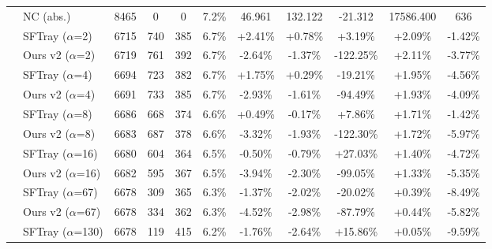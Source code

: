 \begin{table}[t]
{\begin{tabular}{ll|cccc|ccc|cc}
\addlinespace[0.3em]

\midrule

\multirow{25}{*}{cva6} & NC (abs.) & 8465 & 0 & 0 & 7.2\% & 46.961 & 132.122 & -21.312 & 17586.400 & 636 \\

\addlinespace[0.4em]

 & SFTray ($\alpha$=2) & 6715 & 740 & 385 & 6.7\% & +2.41\% & +0.78\% & +3.19\% & +2.09\% & -1.42\% \\

 & Ours v2 ($\alpha$=2) & 6719 & 761 & 392 & 6.7\% & -2.64\% & -1.37\% & -122.25\% & +2.11\% & -3.77\% \\

\addlinespace[0.3em]

 & SFTray ($\alpha$=4) & 6694 & 723 & 382 & 6.7\% & +1.75\% & +0.29\% & -19.21\% & +1.95\% & -4.56\% \\

 & Ours v2 ($\alpha$=4) & 6691 & 733 & 385 & 6.7\% & -2.93\% & -1.61\% & -94.49\% & +1.93\% & -4.09\% \\

\addlinespace[0.3em]

 & SFTray ($\alpha$=8) & 6686 & 668 & 374 & 6.6\% & +0.49\% & -0.17\% & +7.86\% & +1.71\% & -1.42\% \\

 & Ours v2 ($\alpha$=8) & 6683 & 687 & 378 & 6.6\% & -3.32\% & -1.93\% & -122.30\% & +1.72\% & -5.97\% \\

\addlinespace[0.3em]

 & SFTray ($\alpha$=16) & 6680 & 604 & 364 & 6.5\% & -0.50\% & -0.79\% & +27.03\% & +1.40\% & -4.72\% \\

 & Ours v2 ($\alpha$=16) & 6682 & 595 & 367 & 6.5\% & -3.94\% & -2.30\% & -99.05\% & +1.33\% & -5.35\% \\

\addlinespace[0.3em]

 & SFTray ($\alpha$=67) & 6678 & 309 & 365 & 6.3\% & -1.37\% & -2.02\% & -20.02\% & +0.39\% & -8.49\% \\

 & Ours v2 ($\alpha$=67) & 6678 & 334 & 362 & 6.3\% & -4.52\% & -2.98\% & -87.79\% & +0.44\% & -5.82\% \\

\addlinespace[0.3em]

 & SFTray ($\alpha$=130) & 6678 & 119 & 415 & 6.2\% & -1.76\% & -2.64\% & +15.86\% & +0.05\% & -9.59\% \\


\end{tabular}}
\end{table}
